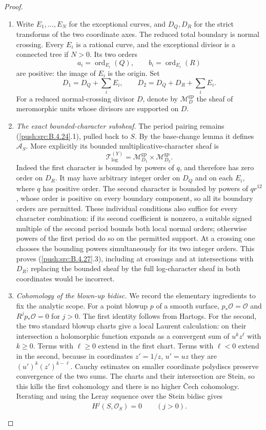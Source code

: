 \begin{proof}
\begin{enumerate}[label=\arabic*.,leftmargin=*]
\item Write $E_1,\ldots,E_N$ for the exceptional curves,
and $D_Q,D_R$ for the strict transforms of the
two coordinate axes. The reduced total boundary
is normal crossing. Every $E_i$ is a rational
curve, and the exceptional divisor is a connected
tree if $N>0$. Its two orders
\[
 a_i=\operatorname{ord}_{E_i}(Q),\qquad
 b_i=\operatorname{ord}_{E_i}(R)
 \tag{B.4.27.2}
\]
are positive: the image of $E_i$ is the origin.
Set
\[
 D_1=D_Q+\sum_i E_i,\qquad
 D_2=D_Q+D_R+\sum_i E_i.
\]
For a reduced normal-crossing divisor $D$, denote
by $\mathcal M_D^{\mathrm{gp}}$ the sheaf of
meromorphic units whose divisors are supported
on $D$.

\item \emph{The exact bounded-character subsheaf.}
The period pairing remains (\ref{push:src:B.4.24}.1), pulled
back to $S$. By the base-change lemma
\citep[Lemma 1.2.9, pp.~80--81]{KKN2008Root}
it defines $\mathcal A_S$. More explicitly its
bounded multiplicative-character sheaf is
\[
 \mathcal T_{\log}^{(Y)}
   =\mathcal M_{D_1}^{\mathrm{gp}}
          \times\mathcal M_{D_2}^{\mathrm{gp}}.
 \tag{B.4.27.3}
\]
Indeed the first character is bounded by powers
of $q$, and therefore has zero order on $D_R$.
It may have arbitrary integer order on $D_Q$
and on each $E_i$, where $q$ has positive order.
The second character is bounded by powers of
$q r^{12}$, whose order is positive on every
boundary component, so all its boundary orders
are permitted. These individual conditions
also suffice for every character combination:
if its second coefficient is nonzero, a suitable
signed multiple of the second period bounds
both local normal orders; otherwise powers of
the first period do so on the permitted support.
At a crossing one chooses the bounding powers
simultaneously for its two integer orders.
This proves (\ref{push:src:B.4.27}.3), including at crossings
and at intersections with $D_R$; replacing the
bounded sheaf by the full log-character sheaf
in both coordinates would be incorrect.

\item \emph{Cohomology of the blown-up bidisc.}
We record the elementary ingredients to fix
the analytic scope. For a point blowup $p$ of
a smooth surface,
$p_*\mathcal O=\mathcal O$ and
$R^j p_*\mathcal O=0$ for $j>0$.
The first identity follows from Hartogs.
For the second, the two standard blowup charts
give a local Laurent calculation: on their
intersection a holomorphic function expands
as a convergent sum of $u^k z^\ell$ with
$k\ge0$. Terms with $\ell\ge0$ extend in
the first chart. Terms with $\ell<0$ extend
in the second, because in coordinates
$z'=1/z$, $u'=uz$ they are
$(u')^k(z')^{k-\ell}$. Cauchy estimates on
smaller coordinate polydiscs preserve convergence
of the two sums. The charts and their
intersection are Stein, so this kills the
first cohomology and there is no higher
\v Cech cohomology. Iterating and using the
Leray sequence over the Stein bidisc gives
\[
 H^j(S,\mathcal O_S)=0\qquad(j>0).
 \tag{B.4.27.4}
\]


\end{enumerate}
\end{proof}
